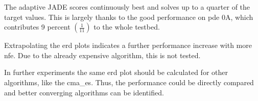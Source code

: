 \documentclass[./\jobname.tex]{subfiles}
\begin{document}
The adaptive JADE scores continuously best and solves up to a quarter of the target values. This is largely thanks to the good performance on \gls{pde} 0A, which contributes 9 percent $\left( \frac{1}{11} \right)$ to the whole testbed.  

Extrapolating the \gls{erd} plots indicates a further performance increase with more \gls{nfe}. Due to the already expensive algorithm, this is not tested. 

In further experiments the same \gls{erd} plot should be calculated for other algorithms, like the \gls{cma_es}. Thus, the performance could be directly compared and better converging algorithms can be identified.  
\end{document}
